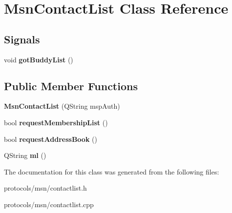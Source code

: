 \hypertarget{classMsnContactList}{
\section{MsnContactList Class Reference}
\label{classMsnContactList}
}
\subsection*{Signals}
\begin{DoxyCompactItemize}
\item 
\hypertarget{classMsnContactList_a9ccc8f8b3eddd028c8e78fbdd7de3b78}{
void {\bfseries gotBuddyList} ()}
\label{classMsnContactList_a9ccc8f8b3eddd028c8e78fbdd7de3b78}

\end{DoxyCompactItemize}
\subsection*{Public Member Functions}
\begin{DoxyCompactItemize}
\item 
\hypertarget{classMsnContactList_af39ccd3a758122f876c554c70d65c7d2}{
{\bfseries MsnContactList} (QString mspAuth)}
\label{classMsnContactList_af39ccd3a758122f876c554c70d65c7d2}

\item 
\hypertarget{classMsnContactList_af1adeb6e8c5e65a6a56af9e8d60a6a07}{
bool {\bfseries requestMembershipList} ()}
\label{classMsnContactList_af1adeb6e8c5e65a6a56af9e8d60a6a07}

\item 
\hypertarget{classMsnContactList_aa9e3b1fe5b3cabbe4b1faba6334595e0}{
bool {\bfseries requestAddressBook} ()}
\label{classMsnContactList_aa9e3b1fe5b3cabbe4b1faba6334595e0}

\item 
\hypertarget{classMsnContactList_a7ce58fd287ee7b634f8a04bdb66ca2d4}{
QString {\bfseries ml} ()}
\label{classMsnContactList_a7ce58fd287ee7b634f8a04bdb66ca2d4}

\end{DoxyCompactItemize}


The documentation for this class was generated from the following files:\begin{DoxyCompactItemize}
\item 
protocols/msn/contactlist.h\item 
protocols/msn/contactlist.cpp\end{DoxyCompactItemize}
